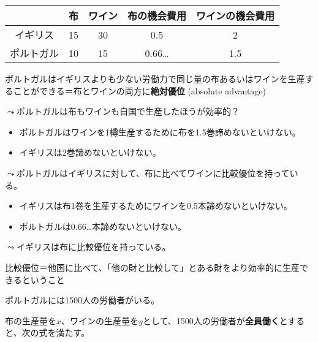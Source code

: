 \documentclass[
  xelatex,
  ja=standard]{bxjsarticle}
\providecommand{\tightlist}{%
  \setlength{\itemsep}{0pt}\setlength{\parskip}{0pt}}\usepackage{longtable,booktabs,array}
\begin{document}
\begin{longtable}[]{@{}ccccc@{}}
\toprule\noalign{}
& 布 & ワイン & 布の機会費用 & ワインの機会費用 \\
\midrule\noalign{}
\endhead
\bottomrule\noalign{}
\endlastfoot
イギリス & 15 & 30 & 0.5 & 2 \\
ポルトガル & 10 & 15 & 0.66\ldots{} & 1.5 \\
\end{longtable}

ポルトガルはイギリスよりも少ない労働力で同じ量の布あるいはワインを生産することができる＝布とワインの両方に\textbf{絶対優位}
(absolute advantage)

\(\leadsto\)ポルトガルは布もワインも自国で生産したほうが効率的？

\begin{itemize}
\tightlist
\item
  ポルトガルはワインを1樽生産するために布を1.5巻諦めないといけない。
\item
  イギリスは2巻諦めないといけない。
\end{itemize}

\(\leadsto\)ポルトガルはイギリスに対して、布に比べてワインに比較優位を持っている。

\begin{itemize}
\tightlist
\item
  イギリスは布1巻を生産するためにワインを0.5本諦めないといけない。
\item
  ポルトガルは0.66\ldots 本諦めないといけない。
\end{itemize}

\(\leadsto\)イギリスは布に比較優位を持っている。

比較優位＝他国に比べて、「他の財と比較して」とある財をより効率的に生産できるということ

\begin{tcolorbox}[enhanced jigsaw, left=2mm, colframe=quarto-callout-tip-color-frame, colback=white, coltitle=black, rightrule=.15mm, title=\textcolor{quarto-callout-tip-color}{\faLightbulb}\hspace{0.5em}{イギリスとポルトガルの貿易'}, arc=.35mm, toprule=.15mm, bottomrule=.15mm, leftrule=.75mm, bottomtitle=1mm, toptitle=1mm, titlerule=0mm, breakable, opacitybacktitle=0.6, colbacktitle=quarto-callout-tip-color!10!white, opacityback=0]

ポルトガルには1500人の労働者がいる。

\end{tcolorbox}

布の生産量を\(x\)、ワインの生産量を\(y\)として、1500人の労働者が\textbf{全員働く}とすると、次の式を満たす。
\end{document}
